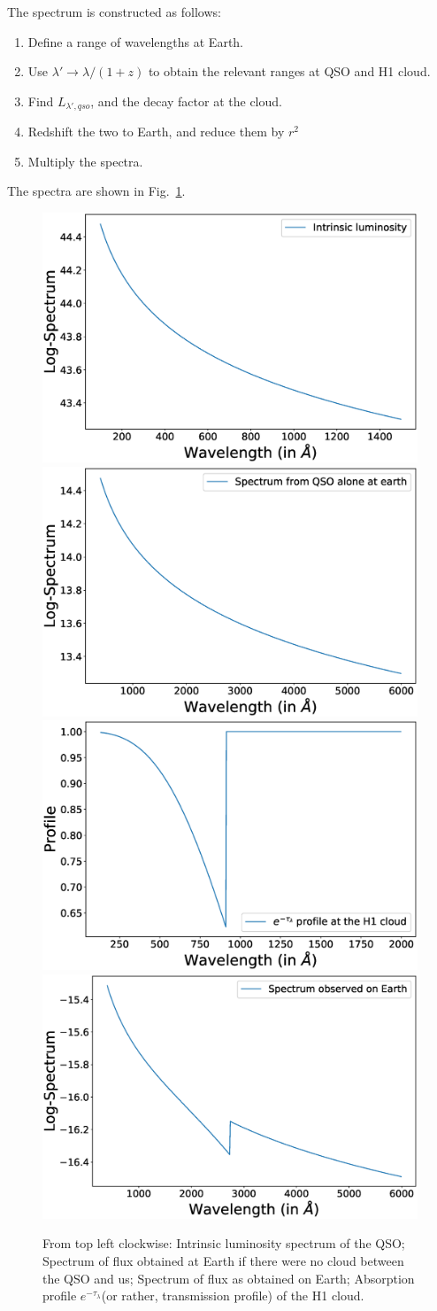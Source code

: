 \documentclass{article}
\begin{document}
The spectrum is constructed as follows:
\begin{enumerate}
\item Define a range of wavelengths at Earth.
\item Use $\lambda' \rightarrow \lambda/(1+z)$ to obtain the relevant ranges at QSO and H1 cloud.
\item Find $L_{\lambda',qso}$, and the decay factor at the cloud.
\item Redshift the two to Earth, and reduce them by $r^2$ 
\item Multiply the spectra.
\end{enumerate}
The spectra are shown in Fig.~\ref{fig:qso_mult}.
\begin{figure}[!htpb]
\centering
\includegraphics[width=0.4\linewidth]{Intrinsic.eps}
\includegraphics[width=0.4\linewidth]{QSO_Earth.eps}
\includegraphics[width=0.4\linewidth]{H1_Earth.eps}
\includegraphics[width=0.4\linewidth]{Earth.eps}
\caption{From top left clockwise: Intrinsic luminosity spectrum of the QSO; Spectrum of flux obtained at Earth if there were no cloud between the QSO and us; Spectrum of flux as obtained on Earth; Absorption profile $e^{-\tau_{\lambda}}$(or rather, transmission profile) of the H1 cloud.}
\label{fig:qso_mult}
\end{figure}%



\end{document}
